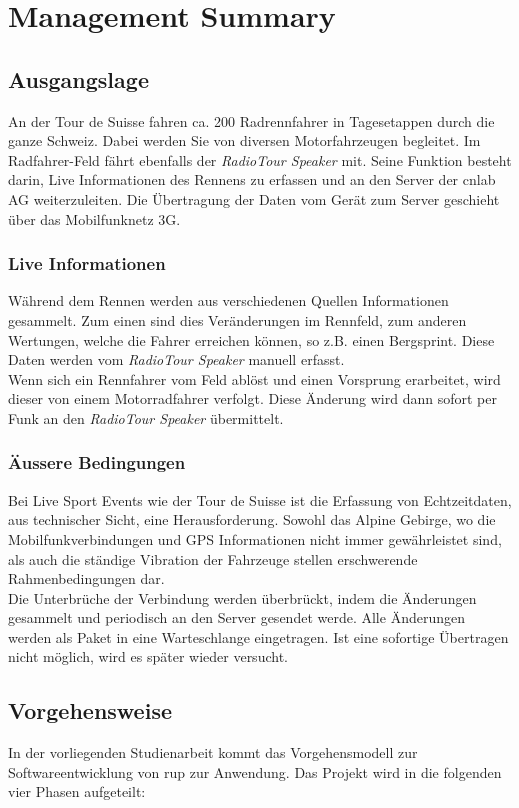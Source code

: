 \chapter*{Management Summary}

\section*{Ausgangslage}
An der Tour de Suisse fahren ca. 200 Radrennfahrer in Tagesetappen durch die ganze Schweiz. Dabei werden Sie von diversen Motorfahrzeugen begleitet. Im Radfahrer-Feld fährt ebenfalls der \textit{RadioTour Speaker} mit. Seine Funktion besteht darin, Live Informationen des Rennens zu erfassen und an den Server der cnlab AG weiterzuleiten.  Die Übertragung der Daten vom Gerät zum Server geschieht über das Mobilfunknetz 3G.

\subsection*{Live Informationen}
Während dem Rennen werden aus verschiedenen Quellen Informationen gesammelt. Zum einen sind dies Veränderungen im Rennfeld, zum anderen Wertungen, welche die Fahrer erreichen können, so z.B. einen Bergsprint. Diese Daten werden vom \textit{RadioTour Speaker} manuell erfasst.
\\
Wenn sich ein Rennfahrer vom Feld ablöst und einen Vorsprung erarbeitet, wird dieser von einem Motorradfahrer verfolgt. Diese Änderung wird dann sofort per Funk an den \textit{RadioTour Speaker} übermittelt.

\subsection*{Äussere Bedingungen}
Bei Live Sport Events wie der Tour de Suisse ist die Erfassung von Echtzeitdaten, aus technischer Sicht, eine Herausforderung. Sowohl das Alpine Gebirge, wo die Mobilfunkverbindungen und GPS Informationen nicht immer gewährleistet sind, als auch die ständige Vibration der Fahrzeuge stellen erschwerende Rahmenbedingungen dar.
\\
Die Unterbrüche der Verbindung werden überbrückt, indem die Änderungen gesammelt und periodisch an den Server gesendet werde. Alle Änderungen werden als Paket in eine Warteschlange eingetragen. Ist eine sofortige Übertragen nicht möglich, wird es später wieder versucht.


\section*{Vorgehensweise}
In der vorliegenden Studienarbeit kommt das Vorgehensmodell zur Softwareentwicklung von \gls{rup} zur Anwendung. Das Projekt wird in die folgenden vier Phasen aufgeteilt:

